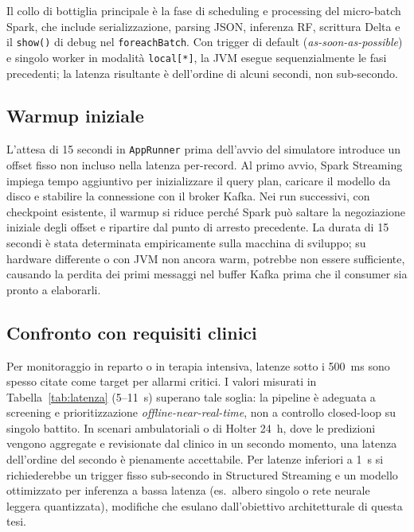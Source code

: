 Il collo di bottiglia principale è la fase di scheduling e processing del micro-batch Spark, che include serializzazione, parsing JSON, inferenza RF, scrittura Delta e il \texttt{show()} di debug nel \texttt{foreachBatch}.
Con trigger di default (\emph{as-soon-as-possible}) e singolo worker in modalità \texttt{local[*]}, la JVM esegue sequenzialmente le fasi precedenti; la latenza risultante è dell'ordine di alcuni secondi, non sub-secondo.

\subsection{Warmup iniziale}

L'attesa di 15 secondi in \texttt{AppRunner} prima dell'avvio del simulatore introduce un offset fisso non incluso nella latenza per-record.
Al primo avvio, Spark Streaming impiega tempo aggiuntivo per inizializzare il query plan, caricare il modello da disco e stabilire la connessione con il broker Kafka.
Nei run successivi, con checkpoint esistente, il warmup si riduce perché Spark può saltare la negoziazione iniziale degli offset e ripartire dal punto di arresto precedente.
La durata di 15 secondi è stata determinata empiricamente sulla macchina di sviluppo; su hardware differente o con JVM non ancora warm, potrebbe non essere sufficiente, causando la perdita dei primi messaggi nel buffer Kafka prima che il consumer sia pronto a elaborarli.

\subsection{Confronto con requisiti clinici}

Per monitoraggio in reparto o in terapia intensiva, latenze sotto i 500~ms sono spesso citate come target per allarmi critici.
I valori misurati in Tabella~\ref{tab:latenza} (5--11~s) superano tale soglia: la pipeline è adeguata a screening e prioritizzazione \emph{offline-near-real-time}, non a controllo closed-loop su singolo battito.
In scenari ambulatoriali o di Holter 24~h, dove le predizioni vengono aggregate e revisionate dal clinico in un secondo momento, una latenza dell'ordine del secondo è pienamente accettabile.
Per latenze inferiori a 1~s si richiederebbe un trigger fisso sub-secondo in Structured Streaming e un modello ottimizzato per inferenza a bassa latenza (es.\ albero singolo o rete neurale leggera quantizzata), modifiche che esulano dall'obiettivo architetturale di questa tesi.

